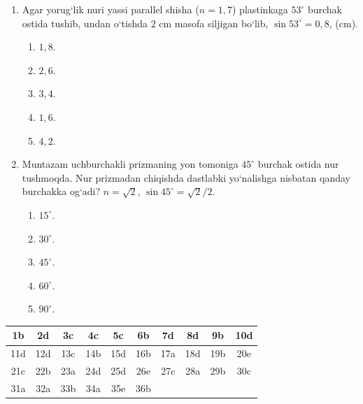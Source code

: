 \begin{enumerate}
\begin{enumerate}[label=\Alph*)]
\item $\dfrac{\sin(\alpha+\beta)}{\sin\alpha}$.
\item $\dfrac{\sin(\alpha-\beta)}{\sin\alpha}$.
\item $\dfrac{\sin(\alpha+\beta)}{2\sin\alpha}$.
\item $\dfrac{\sin(\alpha+\beta)}{\cos\alpha}$.
\item $\dfrac{\sin(\alpha+\beta)}{2\cos\alpha}$.
\end{enumerate}

\item Agar yorug‘lik nuri yassi parallel shisha ($n=1{,}7$) plastinkaga $53^\circ$ burchak ostida tushib, undan o‘tishda $2$ cm masofa siljigan bo‘lib, $\sin53^\circ=0{,}8$, (cm).
\begin{enumerate}[label=\Alph*)]
\item $1{,}8$.
\item $2{,}6$.
\item $3{,}4$.
\item $1{,}6$.
\item $4{,}2$.
\end{enumerate}

\item Muntazam uchburchakli prizmaning yon tomoniga $45^\circ$ burchak ostida nur tushmoqda. Nur prizmadan chiqishda dastlabki yo‘nalishga nisbatan qanday burchakka og‘adi? $n=\sqrt{2}$, $\sin45^\circ=\sqrt{2}/2$.
\begin{enumerate}[label=\Alph*)]
\item $15^\circ$.
\item $30^\circ$.
\item $45^\circ$.
\item $60^\circ$.
\item $90^\circ$.
\end{enumerate}

\end{enumerate}

\begin{center}
\renewcommand{\arraystretch}{1.2}
\begin{tabular}{|c|c|c|c|c|c|c|c|c|c|}
\hline
1b & 2d & 3c & 4c & 5c & 6b & 7d & 8d & 9b & 10d \\
\hline
11d & 12d & 13c & 14b & 15d & 16b & 17a & 18d & 19b & 20e \\
\hline
21c & 22b & 23a & 24d & 25d & 26e & 27c & 28a & 29b & 30c \\
\hline
31a & 32a & 33b & 34a & 35e & 36b & & & & \\
\hline
\end{tabular}
\end{center}






